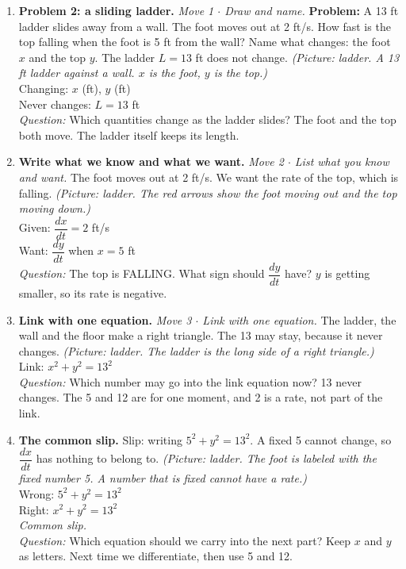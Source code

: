 \documentclass[11pt]{article}
\begin{document}
\begin{enumerate}
\item \textbf{Problem 2: a sliding ladder.} \textit{Move 1 $\cdot$ Draw and name.} \textbf{Problem:} A 13 ft ladder slides away from a wall. The foot moves out at 2 ft/s. How fast is the top falling when the foot is 5 ft from the wall? Name what changes: the foot $x$ and the top $y$. The ladder $L=13$ ft does not change. \textit{(Picture: ladder. A 13 ft ladder against a wall. $x$ is the foot, $y$ is the top.)}\\ Changing: $x$ (ft), $y$ (ft)\\ Never changes: $L=13$ ft\\ \textit{Question:} Which quantities change as the ladder slides?  The foot and the top both move. The ladder itself keeps its length.
\item \textbf{Write what we know and what we want.} \textit{Move 2 $\cdot$ List what you know and want.} The foot moves out at 2 ft/s. We want the rate of the top, which is falling. \textit{(Picture: ladder. The red arrows show the foot moving out and the top moving down.)}\\ Given: $\dfrac{dx}{dt}=2$ ft/s\\ Want: $\dfrac{dy}{dt}$ when $x=5$ ft\\ \textit{Question:} The top is FALLING. What sign should $\dfrac{dy}{dt}$ have?  $y$ is getting smaller, so its rate is negative.
\item \textbf{Link with one equation.} \textit{Move 3 $\cdot$ Link with one equation.} The ladder, the wall and the floor make a right triangle. The 13 may stay, because it never changes. \textit{(Picture: ladder. The ladder is the long side of a right triangle.)}\\ Link: $x^2+y^2=13^2$\\ \textit{Question:} Which number may go into the link equation now?  13 never changes. The 5 and 12 are for one moment, and 2 is a rate, not part of the link.
\item \textbf{The common slip.} Slip: writing $5^2+y^2=13^2$. A fixed 5 cannot change, so $\dfrac{dx}{dt}$ has nothing to belong to. \textit{(Picture: ladder. The foot is labeled with the fixed number 5. A number that is fixed cannot have a rate.)}\\ Wrong: $5^2+y^2=13^2$\\ Right: $x^2+y^2=13^2$\\ \textit{Common slip.}\\ \textit{Question:} Which equation should we carry into the next part?  Keep $x$ and $y$ as letters. Next time we differentiate, then use 5 and 12.
\end{enumerate}
\end{document}
